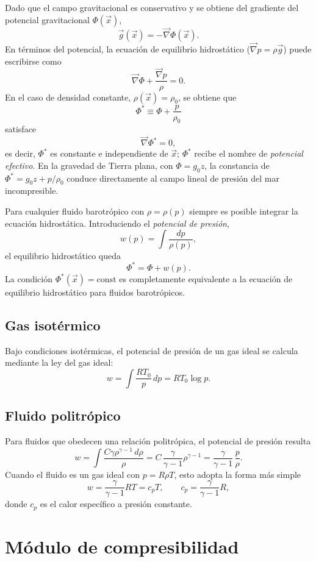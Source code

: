 Dado que el campo gravitacional es conservativo y se obtiene del gradiente del potencial gravitacional $\Phi(\vec{x})$,
$$ \vec{g}(\vec{x}) = -\vec{\nabla}\Phi(\vec{x}). $$
En términos del potencial, la ecuación de equilibrio hidrostático ($\vec{\nabla}p = \rho\vec{g}$) puede escribirse como
$$ \vec{\nabla}\Phi + \frac{\vec{\nabla}p}{\rho} = 0. $$
En el caso de densidad constante, $\rho(\vec{x}) = \rho_0$, se obtiene que
$$ \Phi^{*} \equiv \Phi + \frac{p}{\rho_0} $$
satisface
$$ \vec{\nabla}\Phi^{*} = 0, $$
es decir, $\Phi^{*}$ es constante e independiente de $\vec{x}$; $\Phi^{*}$ recibe el nombre de \emph{potencial efectivo}. En la gravedad de Tierra plana, con $\Phi = g_0 z$, la constancia de $\Phi^{*} = g_0 z + p/\rho_0$ conduce directamente al campo lineal de presión del mar incompresible.

Para cualquier fluido barotrópico con $\rho = \rho(p)$ siempre es posible integrar la ecuación hidrostática. Introduciendo el \emph{potencial de presión},
$$ w(p) = \int \frac{dp}{\rho(p)}, $$
el equilibrio hidrostático queda
$$ \Phi^{*} = \Phi + w(p). $$
La condición $\Phi^{*}(\vec{x}) = \mathrm{const}$ es completamente equivalente a la ecuación de equilibrio hidrostático para fluidos barotrópicos.

\subsection{Gas isotérmico}

Bajo condiciones isotérmicas, el potencial de presión de un gas ideal se calcula mediante la ley del gas ideal:
$$ w = \int \frac{RT_0}{p}\,dp = RT_0 \log p. $$

\subsection{Fluido politrópico}

Para fluidos que obedecen una relación politrópica, el potencial de presión resulta
$$ w = \int \frac{C\gamma\rho^{\gamma-1}\,d\rho}{\rho} = C\,\frac{\gamma}{\gamma-1}\rho^{\gamma-1} = \frac{\gamma}{\gamma-1}\,\frac{p}{\rho}. $$
Cuando el fluido es un gas ideal con $p = R\rho T$, esto adopta la forma más simple
$$ w = \frac{\gamma}{\gamma-1}RT = c_p T, \qquad c_p = \frac{\gamma}{\gamma-1}R, $$
donde $c_p$ es el calor específico a presión constante.

\section{Módulo de compresibilidad}

